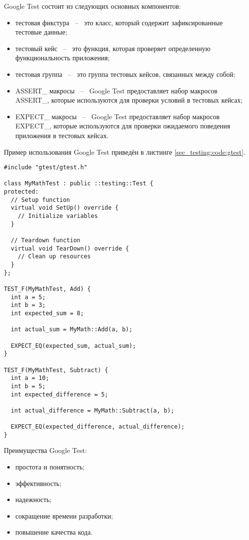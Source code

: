 Google Test состоит из следующих основных компонентов:

\begin{itemize}
    \item тестовая фикстура ~--~ это класс, который содержит зафиксированные тестовые данные;
    \item тестовый кейс ~--~ это функция, которая проверяет определенную функциональность приложения;
    \item тестовая группа ~--~ это группа тестовых кейсов, связанных между собой;
    \item ASSERT\_ макросы ~--~ Google Test предоставляет набор макросов ASSERT\_, которые используются для проверки условий в тестовых кейсах;
    \item EXPECT\_ макросы ~--~ Google Test предоставляет набор макросов EXPECT\_, которые используются для проверки ожидаемого поведения приложения в тестовых кейсах.
\end{itemize}

Пример использования Google Test приведён в листинге \ref{sec_testing:code:gtest}.
\pagebreak
\begin{lstlisting}[style=CodeListing, caption={Пример тестов, описанных с помощью GTest}, label=sec_testing:code:gtest]
#include "gtest/gtest.h"

class MyMathTest : public ::testing::Test {
protected:
  // Setup function
  virtual void SetUp() override {
    // Initialize variables
  }

  // Teardown function
  virtual void TearDown() override {
    // Clean up resources
  }
};

TEST_F(MyMathTest, Add) {
  int a = 5;
  int b = 3;
  int expected_sum = 8;

  int actual_sum = MyMath::Add(a, b);

  EXPECT_EQ(expected_sum, actual_sum);
}

TEST_F(MyMathTest, Subtract) {
  int a = 10;
  int b = 5;
  int expected_difference = 5;

  int actual_difference = MyMath::Subtract(a, b);

  EXPECT_EQ(expected_difference, actual_difference);
}
\end{lstlisting}

Преимущества Google Test:
\begin{itemize}
    \item простота и понятность;
    \item эффективность;
    \item надежность;
    \item сокращение времени разработки;
    \item повышение качества кода.
\end{itemize}

